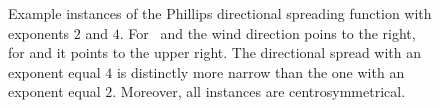 \begin{figure}
{ }
 \hfill
 \hfill
\caption{Example instances of the Phillips directional spreading function with 
exponents $2$ and $4$. For~ and
 the wind direction poins to 
the right, for  and
 it points to the upper right. 
The directional spread with an exponent equal $4$ is distinctly more narrow 
than the one with an exponent equal $2$. Moreover, all instances are
centrosymmetrical.}
\label{fig:phillips_directional_term}
\end{figure}
